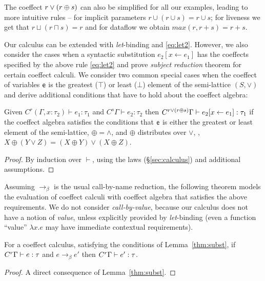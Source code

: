 The coeffect $r \vee (r \oplus s)$ can
also be simplified for all our examples, leading to more intuitive
rules -- for implicit parameters $r \cup (r \cup s) = r \cup s$; for
liveness we get that $r \sqcup (r \sqcap s) = r$ and for dataflow we
obtain $\textit{max}(r, r+s) = r + s$.

Our calculus can be extended with \emph{let}-binding and \eqref{eq:let2}.
However, we also consider the cases when a
syntactic substitution $e_2[x \leftarrow e_1]$ has the coeffects
specified by the above rule \eqref{eq:let2} 
and prove \emph{subject reduction} theorem
for certain coeffect calculi.  We consider two common special cases
when the coeffect of variables $\mathsf{e}$ is the greatest ($\top$) or
least ($\bot$) element of the semi-lattice $(S, \vee)$ and derive
additional conditions that have to hold about the coeffect algebra:

\begin{lemma}[Substitution]
\label{thm:subst}
Given $C^r (\Gamma, x : \tau_2) \vdash e_1 : \tau_1$ and $C^s \Gamma \vdash e_2 : \tau_2$
then $C^{r \vee (r \oplus s)} \Gamma \vdash e_2[x \leftarrow e_1] : \tau_1$ if 
the coeffect algebra satisfies the conditions that 
$\mathsf{e}$ is either the greatest or least element of the semi-lattice,
$\oplus = \wedge$, and $\oplus$ distributes over $\vee$,
\ie{}, $X \oplus (Y \vee Z) = (X \oplus Y) \vee (X \oplus Z)$.
\end{lemma}

\begin{proof}
By induction over $\vdash$, using the laws (\S\ref{sec:calculus}) and additional assumptions.
\end{proof}

Assuming $\rightarrow_\beta$ is the usual call-by-name reduction, the
following theorem models the evaluation of coeffect calculi with
coeffect algebra that satisfies the above requirements. We do not
consider \emph{call-by-value}, because our calculus does not have a
notion of \emph{value}, unless explicitly provided by
\emph{let}-binding (even a function ``value'' $\lambda x.e$ may have
immediate contextual requirements).

\begin{theorem}
\label{thm:reduction}
For a coeffect calculus, satisfying the conditions of Lemma~\ref{thm:subst}, if
$C^{r}\Gamma \vdash e : \tau$ and $e \rightarrow_\beta e'$ then 
$C^{r}\Gamma \vdash e' : \tau$.
\end{theorem}
\begin{proof}
A direct consequence of Lemma~\ref{thm:subst}. 
\end{proof}

